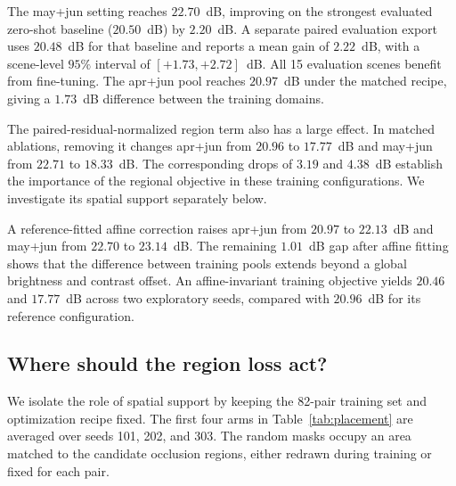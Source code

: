 The may+jun setting reaches $22.70$~dB, improving on
the strongest evaluated zero-shot baseline ($20.50$~dB)
by $2.20$~dB. A separate paired evaluation export uses
$20.48$~dB for that baseline and reports a mean gain
of $2.22$~dB, with a scene-level $95\%$ interval
of $[+1.73,+2.72]$~dB. All 15 evaluation scenes
benefit from fine-tuning. The apr+jun pool reaches
$20.97$~dB under the matched recipe, giving a
$1.73$~dB difference between the training domains.

The paired-residual-normalized region term also has a
large effect. In matched ablations, removing it changes
apr+jun from $20.96$ to $17.77$~dB and may+jun
from $22.71$ to $18.33$~dB. The corresponding drops
of $3.19$ and $4.38$~dB establish the importance of
the regional objective in these training configurations.
We investigate its spatial support separately below.

A reference-fitted affine correction raises apr+jun
from $20.97$ to $22.13$~dB and may+jun from
$22.70$ to $23.14$~dB. The remaining $1.01$~dB
gap after affine fitting shows that the difference
between training pools extends beyond a global
brightness and contrast offset. An affine-invariant
training objective yields $20.46$ and $17.77$~dB
across two exploratory seeds, compared with
$20.96$~dB for its reference configuration.



\subsection{Where should the region loss act?}
\label{sec:diag}

We isolate the role of spatial support by keeping the
82-pair training set and optimization recipe fixed.
The first four arms in Table~\ref{tab:placement}
are averaged over seeds 101, 202, and 303.
The random masks occupy an area matched to the
candidate occlusion regions, either redrawn during
training or fixed for each pair.


